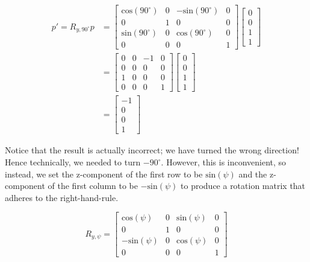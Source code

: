 \documentclass[12pt,letterpaper]{article}
\begin{document}
\begin{equation}
    \begin{aligned}
    p' = R_{y, 90^{\circ}}p
    &= \begin{bmatrix}
        \text{cos}(90^{\circ})    & 0     & -\text{sin}(90^{\circ}) & 0 \\
        0                         & 1     &  0                      & 0 \\
       \text{sin}(90^{\circ})     & 0     &  \text{cos}(90^{\circ}) & 0 \\
        0                         & 0     &  0                      & 1
    \end{bmatrix}
     \begin{bmatrix}
        0 \\
        0 \\
        1 \\
        1
    \end{bmatrix} \\
    &= \begin{bmatrix}
        0 & 0 & -1 & 0 \\
        0 & 0 &  0 & 0 \\
        1 & 0 &  0 & 0 \\
        0 & 0 &  0 & 1
    \end{bmatrix}
     \begin{bmatrix}
        0 \\
        0 \\
        1 \\
        1
    \end{bmatrix} \\
    &= \begin{bmatrix}
        -1 \\
        0 \\
        0 \\
        1
    \end{bmatrix}
    \end{aligned}
\end{equation}

Notice that the result is actually incorrect; we have turned the wrong direction! Hence technically, we needed to turn $-90^{\circ}$. However, this is inconvenient, so instead, we set the z-component of the first row to be $\text{sin}(\psi)$ and the z-component of the first column to be $-\text{sin}(\psi)$ to produce a rotation matrix that adheres to the right-hand-rule.

\begin{equation}
    R_{y, \psi} = \begin{bmatrix}
        \text{cos}(\psi)    & 0     & \text{sin}(\psi) & 0 \\
        0                   & 1     &  0                & 0 \\
       -\text{sin}(\psi)     & 0     &  \text{cos}(\psi) & 0 \\
        0                   & 0     &  0                & 1
    \end{bmatrix}
\end{equation}
\end{document}
